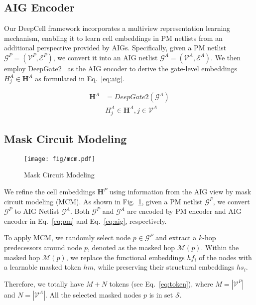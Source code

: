 \subsection{AIG Encoder}
Our DeepCell framework incorporates a multiview representation learning mechanism, enabling it to learn cell embeddings in PM netlists from an additional perspective provided by AIGs. Specifically, given a PM netlist $\mathcal{G}^P=(\mathcal{V}^P, \mathcal{E}^P)$, we convert it into an AIG netlist $\mathcal{G}^A=(\mathcal{V}^A, \mathcal{E}^A)$. We then employ DeepGate2~\cite{shi2023deepgate2} as the AIG encoder to derive the gate-level embeddings $H_j^A\in\mathbf{H}^A$ as formulated in Eq.~\eqref{eq:aig}. 

\begin{equation} \label{eq:aig}
    \begin{split}
        \mathbf{H}^A & = DeepGate2(\mathcal{G}^A) \\
        & H_j^A \in \mathbf{H}^A, j \in \mathcal{V}^A 
    \end{split}
\end{equation}

\subsection{Mask Circuit Modeling}
\begin{figure} [!t]
    \centering
    \texttt{[image: fig/mcm.pdf]}
    \vspace{-5pt}
    \caption{Mask Circuit Modeling}
    \label{fig:mcm}
    \vspace{-15pt}
\end{figure}

We refine the cell embeddings $\mathbf{H}^P$ using information from the AIG view by mask circuit modeling (MCM). As shown in Fig.~\ref{fig:mcm}, given a PM netlist $\mathcal{G}^P$, we convert $\mathcal{G}^P$ to AIG Netlist $\mathcal{G}^A$. Both $\mathcal{G}^P$ and $\mathcal{G}^A$ are encoded by PM encoder and AIG encoder in Eq.~\eqref{eq:pm} and Eq.~\eqref{eq:aig}, respectively. 

To apply MCM, we randomly select node $p \in \mathcal{G}^P$ and extract a $k$-hop predecessors around node $p$, denoted as the masked hop $\mathcal{M}(p)$. Within the masked hop $\mathcal{M}(p)$, we replace the functional embeddings $hf_i$ of the nodes with a learnable masked token $hm$, while preserving their structural embeddings $hs_i$. 

Therefore, we totally have $M+N$ tokens (see Eq.~\eqref{eq:token}), where $M = |\mathcal{V}^P|$ and $N = |\mathcal{V}^A|$. All the selected masked nodes $p$ is in set $\mathcal{S}$. 

